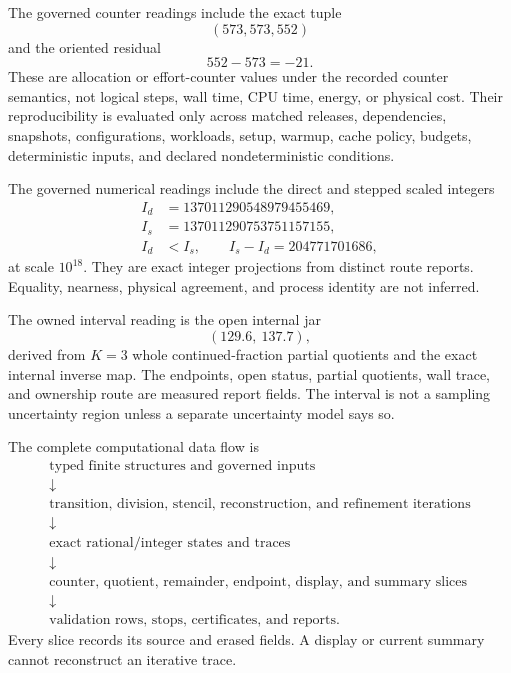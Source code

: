 The governed counter readings include the exact tuple
\[
                         (573,573,552)
\]
and the oriented residual
\[
                         552-573=-21.
\]
These are allocation or effort-counter values under the recorded counter semantics, not logical steps, wall time,
CPU time, energy, or physical cost.  Their reproducibility is evaluated only across matched releases, dependencies,
snapshots, configurations, workloads, setup, warmup, cache policy, budgets, deterministic inputs, and declared
nondeterministic conditions.

The governed numerical readings include the direct and stepped scaled integers
\[
\begin{aligned}
I_d&=137011290548979455469,\\
I_s&=137011290753751157155,\\
I_d&<I_s,\qquad I_s-I_d=204771701686,
\end{aligned}
\]
at scale \(10^{18}\).  They are exact integer projections from distinct route reports.  Equality, nearness, physical
agreement, and process identity are not inferred.

The owned interval reading is the open internal jar
\[
                         (129.6,\ 137.7),
\]
derived from \(K=3\) whole continued-fraction partial quotients and the exact internal inverse map.  The endpoints,
open status, partial quotients, wall trace, and ownership route are measured report fields.  The interval is not a
sampling uncertainty region unless a separate uncertainty model says so.

The complete computational data flow is
\[
\begin{array}{c}
\text{typed finite structures and governed inputs}\\
\downarrow\\
\text{transition, division, stencil, reconstruction, and refinement iterations}\\
\downarrow\\
\text{exact rational/integer states and traces}\\
\downarrow\\
\text{counter, quotient, remainder, endpoint, display, and summary slices}\\
\downarrow\\
\text{validation rows, stops, certificates, and reports}.
\end{array}
\]
Every slice records its source and erased fields.  A display or current summary cannot reconstruct an iterative trace.

